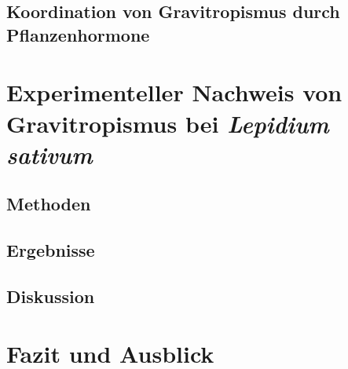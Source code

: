 \documentclass[
a4paper, 
11pt, 
ngerman,
listof=totoc,
bibliography=totocnumbered
]{scrreprt}
\begin{document}
\section{Koordination von Gravitropismus durch Pflanzenhormone}

\chapter{Experimenteller Nachweis von Gravitropismus bei \emph{Lepidium sativum}}

\section{Methoden}

\section{Ergebnisse}

\section{Diskussion}

\chapter{Fazit und Ausblick}


\printbibliography
\end{document}
